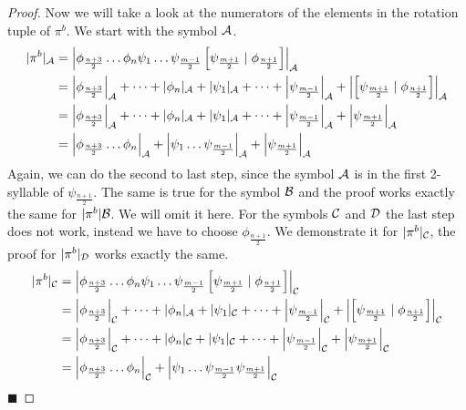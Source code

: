 \begin{proof}
	Now we will take a look at the numerators of the elements in the rotation tuple of $\pi^b$.
	We start with the symbol $\mathcal{A}$.
	\begin{align*}
		|\pi^b|_{\mathcal{A}} & = \left|\phi_{\frac{n+3}{2}} \dots \phi_n \psi_1 \dots \psi_{\frac{m-1}{2}} \left[\psi_{\frac{m+1}{2}} \mid \phi_{\frac{n+1}{2}}\right]\right|_{\mathcal{A}}                                                       \\
		           & = \left|\phi_{\frac{n+3}{2}}\right|_{\mathcal{A}} + \dots + |\phi_n|_{\mathcal{A}} + |\psi_1|_{\mathcal{A}} + \dots + \left|\psi_{\frac{m-1}{2}}\right|_{\mathcal{A}} + \left|\left[\psi_{\frac{m+1}{2}} \mid \phi_{\frac{n+1}{2}}\right]\right|_{\mathcal{A}} \\
		           & = \left|\phi_{\frac{n+3}{2}}\right|_{\mathcal{A}} + \dots + |\phi_n|_{\mathcal{A}} + |\psi_1|_{\mathcal{A}} + \dots + \left|\psi_{\frac{m-1}{2}}\right|_{\mathcal{A}} + \left|\psi_{\frac{m+1}{2}}\right|_{\mathcal{A}}                                        \\
		           & = \left|\phi_{\frac{n+3}{2}} \dots \phi_n\right|_{\mathcal{A}} + \left|\psi_1 \dots \psi_{\frac{m-1}{2}}\right|_{\mathcal{A}} + \left|\psi_{\frac{m+1}{2}}\right|_{\mathcal{A}}
	\end{align*}
	Again, we can do the second to last step, since the symbol $\mathcal{A}$ is in the first 2-syllable of $\psi_{\frac{n+1}{2}}$.
	The same is true for the symbol $\mathcal{B}$ and the proof works exactly the same for $|\pi^b|\mathcal{B}$.
	We will omit it here.
	For the symbols $\mathcal{C}$ and $\mathcal{D}$ the last step does not work, instead we have to choose $\phi_{\frac{n+1}{2}}$.
	We demonstrate it for $|\pi^b|_{\mathcal{C}}$, the proof for $|\pi^b|_{\mathcal{D}}$ works exactly the same.
	\begin{align*}
		|\pi^b|_{\mathcal{C}} & = \left|\phi_{\frac{n+3}{2}} \dots \phi_n \psi_1 \dots \psi_{\frac{m-1}{2}} \left[\psi_{\frac{m+1}{2}} \mid \phi_{\frac{n+1}{2}}\right]\right|_{\mathcal{C}}                                                       \\
		           & = \left|\phi_{\frac{n+3}{2}}\right|_{\mathcal{C}} + \dots + |\phi_n|_{\mathcal{A}} + |\psi_1|_{\mathcal{C}} + \dots + \left|\psi_{\frac{m-1}{2}}\right|_{\mathcal{C}} + \left|\left[\psi_{\frac{m+1}{2}} \mid \phi_{\frac{n+1}{2}}\right]\right|_{\mathcal{C}} \\
		           & = \left|\phi_{\frac{n+3}{2}}\right|_{\mathcal{C}} + \dots + |\phi_n|_{\mathcal{C}} + |\psi_1|_{\mathcal{C}} + \dots + \left|\psi_{\frac{m-1}{2}}\right|_{\mathcal{C}} + \left|\psi_{\frac{m+1}{2}}\right|_{\mathcal{C}}                                        \\
		           & = \left|\phi_{\frac{n+3}{2}} \dots \phi_n\right|_{\mathcal{C}} + \left|\psi_1 \dots \psi_{\frac{m-1}{2}} \psi_{\frac{m+1}{2}}\right|_{\mathcal{C}}
	\end{align*}
	\hfill $\blacksquare$
\end{proof}

